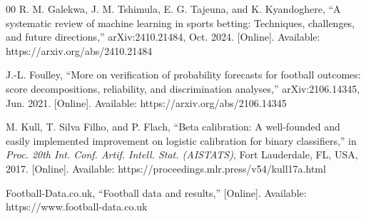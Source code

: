 \documentclass[conference]{IEEEtran}
\begin{document}
\begin{thebibliography}{00}
 R. M. Galekwa, J. M. Tshimula, E. G. Tajeuna,
and K. Kyandoghere, ``A systematic review of machine learning
in sports betting: Techniques, challenges, and future
directions,'' arXiv:2410.21484, Oct. 2024. [Online]. Available:
https://arxiv.org/abs/2410.21484

 J.-L. Foulley, ``More on verification of
probability forecasts for football outcomes: score
decompositions, reliability, and discrimination analyses,''
arXiv:2106.14345, Jun. 2021. [Online]. Available:
https://arxiv.org/abs/2106.14345

 M. Kull, T. Silva Filho, and P. Flach, ``Beta
calibration: A well-founded and easily implemented improvement
on logistic calibration for binary classifiers,'' in
\textit{Proc. 20th Int. Conf. Artif. Intell. Stat. (AISTATS)},
Fort Lauderdale, FL, USA, 2017. [Online]. Available:
https://proceedings.mlr.press/v54/kull17a.html

 Football-Data.co.uk, ``Football data and
results,'' [Online]. Available: https://www.football-data.co.uk

\end{thebibliography}
\end{document}
